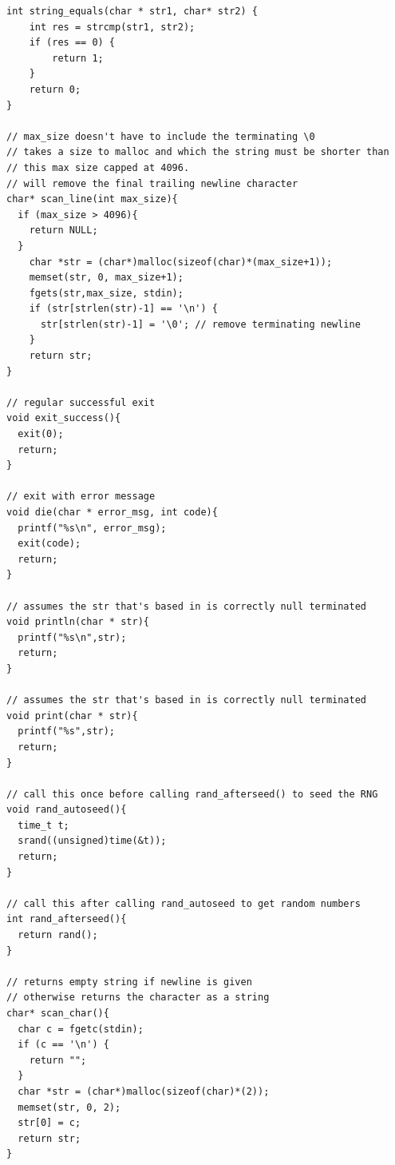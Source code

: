 \documentclass[12pt]{article}
\begin{document}
\begin{mdframed}[hidealllines=true,backgroundcolor=blue!20]
\begin{lstlisting}
int string_equals(char * str1, char* str2) {
	int res = strcmp(str1, str2);
	if (res == 0) {
		return 1;
	}
	return 0;
}

// max_size doesn't have to include the terminating \0
// takes a size to malloc and which the string must be shorter than
// this max size capped at 4096.
// will remove the final trailing newline character
char* scan_line(int max_size){
  if (max_size > 4096){
    return NULL;
  }
    char *str = (char*)malloc(sizeof(char)*(max_size+1));
    memset(str, 0, max_size+1);
    fgets(str,max_size, stdin);
    if (str[strlen(str)-1] == '\n') {
      str[strlen(str)-1] = '\0'; // remove terminating newline
    }
    return str;
}

// regular successful exit
void exit_success(){
  exit(0);
  return;
}

// exit with error message
void die(char * error_msg, int code){
  printf("%s\n", error_msg);
  exit(code);
  return;
}

// assumes the str that's based in is correctly null terminated
void println(char * str){
  printf("%s\n",str);
  return;
}

// assumes the str that's based in is correctly null terminated
void print(char * str){
  printf("%s",str);
  return;
}

// call this once before calling rand_afterseed() to seed the RNG
void rand_autoseed(){
  time_t t;
  srand((unsigned)time(&t));
  return;   
}

// call this after calling rand_autoseed to get random numbers
int rand_afterseed(){
  return rand();
}

// returns empty string if newline is given
// otherwise returns the character as a string
char* scan_char(){
  char c = fgetc(stdin);
  if (c == '\n') {
    return ""; 
  }
  char *str = (char*)malloc(sizeof(char)*(2));
  memset(str, 0, 2);
  str[0] = c;
  return str;
}\end{lstlisting}
\end{mdframed}
\end{document}
